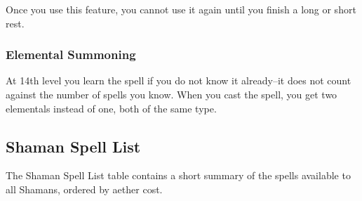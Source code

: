 Once you use this feature, you cannot use it again until you finish a long or short rest.

\subsubsection{Elemental Summoning}
At 14th level you learn the  spell if you do not know it already--it does not count against the number of spells you know. When you cast the spell, you get two elementals instead of one, both of the same type.

\subsection{Shaman Spell List}
The Shaman Spell List table contains a short summary of the spells available to all Shamans, ordered by aether cost.


